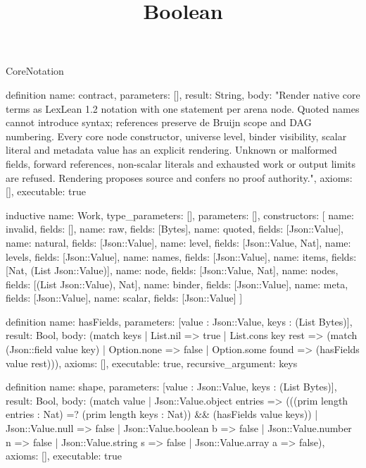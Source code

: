 \begin{lexlean}{CoreNotation}
\title{Boolean}
\begin{semanticmodule}

definition{
 name: contract,
 parameters: [],
 result: String,
 body: "Render native core terms as LexLean 1.2 notation with one statement per arena node. Quoted names cannot introduce syntax; references preserve de Bruijn scope and DAG numbering. Every core node constructor, universe level, binder visibility, scalar literal and metadata value has an explicit rendering. Unknown or malformed fields, forward references, non-scalar literals and exhausted work or output limits are refused. Rendering proposes source and confers no proof authority.",
 axioms: [],
 executable: true
}

inductive{
 name: Work,
 type_parameters: [],
 parameters: [],
 constructors: [
  {name: invalid, fields: []},
  {name: raw, fields: [Bytes]},
  {name: quoted, fields: [Json::Value]},
  {name: natural, fields: [Json::Value]},
  {name: level, fields: [Json::Value, Nat]},
  {name: levels, fields: [Json::Value]},
  {name: names, fields: [Json::Value]},
  {name: items, fields: [Nat, (List Json::Value)]},
  {name: node, fields: [Json::Value, Nat]},
  {name: nodes, fields: [(List Json::Value), Nat]},
  {name: binder, fields: [Json::Value]},
  {name: meta, fields: [Json::Value]},
  {name: scalar, fields: [Json::Value]}
 ]
}

definition{
 name: hasFields,
 parameters: [value : Json::Value, keys : (List Bytes)],
 result: Bool,
 body: (match keys | List.nil => true | List.cons key rest => (match (Json::field value key) | Option.none => false | Option.some found => (hasFields value rest))),
 axioms: [],
 executable: true,
 recursive_argument: keys
}

definition{
 name: shape,
 parameters: [value : Json::Value, keys : (List Bytes)],
 result: Bool,
 body: (match value | Json::Value.object entries => (((prim length entries : Nat) =? (prim length keys : Nat)) && (hasFields value keys)) | Json::Value.null => false | Json::Value.boolean b => false | Json::Value.number n => false | Json::Value.string s => false | Json::Value.array a => false),
 axioms: [],
 executable: true
}


\end{semanticmodule}
\end{lexlean}
